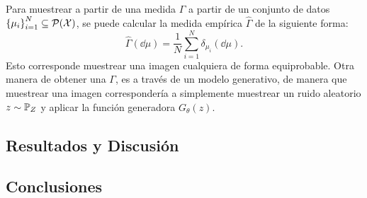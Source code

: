 Para muestrear a partir de una medida $\Gamma$ a partir de un conjunto de datos $\left\{ \mu_i \right\}_{i=1}^{N} \subseteq \ProbSpace[\cX] $, se puede calcular la medida empírica $\hat \Gamma$ de la siguiente forma:
\begin{equation}\label{eq:medida-empirica}
    \hat \Gamma (\dd \mu) = \frac{1}{N} \sum_{i=1}^{N} \delta_{\mu_i} (\dd \mu).
\end{equation}
Esto corresponde muestrear una imagen cualquiera de forma equiprobable. Otra manera de obtener una $\Gamma$, es a través de un modelo generativo, de manera que muestrear una imagen correspondería a simplemente muestrear un ruido aleatorio $z \sim \Prob_Z$ y aplicar la función generadora $G_\theta(z)$.

\subsection{Resultados y Discusión}\label{ssec:sgdw-resultados-discusion}  %


\subsection{Conclusiones}\label{ssec:sgdw-conclusiones}  %



